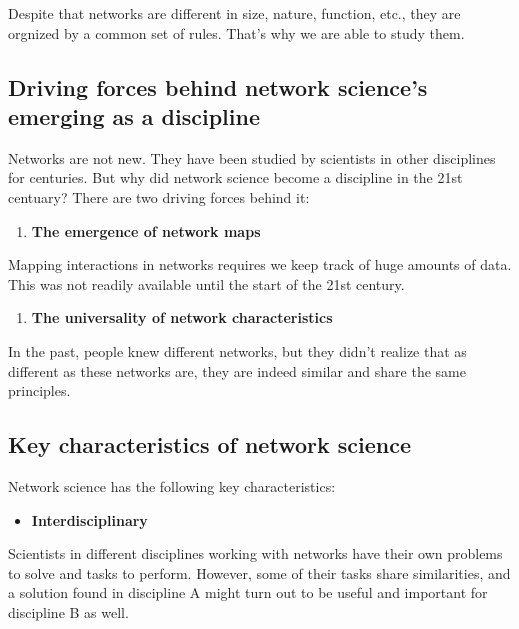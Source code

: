 \documentclass[
]{krantz}
\providecommand{\tightlist}{%
  \setlength{\itemsep}{0pt}\setlength{\parskip}{0pt}}
\begin{document}
Despite that networks are different in size, nature, function, etc., they are orgnized by a common set of rules. That's why we are able to study them.

\hypertarget{driving-forces-behind-network-sciences-emerging-as-a-discipline}{%
\subsection{Driving forces behind network science's emerging as a discipline}\label{driving-forces-behind-network-sciences-emerging-as-a-discipline}}

Networks are not new. They have been studied by scientists in other disciplines for centuries. But why did network science become a discipline in the 21st centuary? There are two driving forces behind it:

\begin{enumerate}
\def\labelenumi{\arabic{enumi}.}
\tightlist
\item
  \textbf{The emergence of network maps}
\end{enumerate}

Mapping interactions in networks requires we keep track of huge amounts of data. This was not readily available until the start of the 21st century.

\begin{enumerate}
\def\labelenumi{\arabic{enumi}.}
\setcounter{enumi}{1}
\tightlist
\item
  \textbf{The universality of network characteristics}
\end{enumerate}

In the past, people knew different networks, but they didn't realize that as different as these networks are, they are indeed similar and share the same principles.

\hypertarget{key-characteristics-of-network-science}{%
\subsection{Key characteristics of network science}\label{key-characteristics-of-network-science}}

Network science has the following key characteristics:

\begin{itemize}
\tightlist
\item
  \textbf{Interdisciplinary}
\end{itemize}

Scientists in different disciplines working with networks have their own problems to solve and tasks to perform. However, some of their tasks share similarities, and a solution found in discipline A might turn out to be useful and important for discipline B as well.
\end{document}
